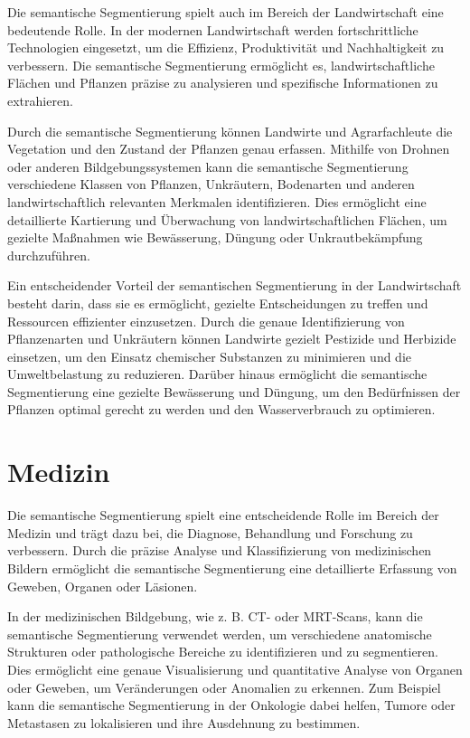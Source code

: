Die semantische Segmentierung spielt auch im Bereich der Landwirtschaft eine
bedeutende Rolle. In der modernen Landwirtschaft werden fortschrittliche
Technologien eingesetzt, um die Effizienz, Produktivität und Nachhaltigkeit zu
verbessern. Die semantische Segmentierung ermöglicht es, landwirtschaftliche
Flächen und Pflanzen präzise zu analysieren und spezifische Informationen zu
extrahieren.

Durch die semantische Segmentierung können Landwirte und Agrarfachleute die
Vegetation und den Zustand der Pflanzen genau erfassen. Mithilfe von Drohnen
oder anderen Bildgebungssystemen kann die semantische Segmentierung
verschiedene Klassen von Pflanzen, Unkräutern, Bodenarten und anderen
landwirtschaftlich relevanten Merkmalen identifizieren. Dies ermöglicht eine
detaillierte Kartierung und Überwachung von landwirtschaftlichen Flächen, um
gezielte Maßnahmen wie Bewässerung, Düngung oder Unkrautbekämpfung
durchzuführen.

Ein entscheidender Vorteil der semantischen Segmentierung in der Landwirtschaft
besteht darin, dass sie es ermöglicht, gezielte Entscheidungen zu treffen und
Ressourcen effizienter einzusetzen. Durch die genaue Identifizierung von
Pflanzenarten und Unkräutern können Landwirte gezielt Pestizide und Herbizide
einsetzen, um den Einsatz chemischer Substanzen zu minimieren und die
Umweltbelastung zu reduzieren. Darüber hinaus ermöglicht die semantische
Segmentierung eine gezielte Bewässerung und Düngung, um den Bedürfnissen der
Pflanzen optimal gerecht zu werden und den Wasserverbrauch zu optimieren.

\section{Medizin}
Die semantische Segmentierung spielt eine entscheidende Rolle im Bereich der
Medizin und trägt dazu bei, die Diagnose, Behandlung und Forschung zu
verbessern. Durch die präzise Analyse und Klassifizierung von medizinischen
Bildern ermöglicht die semantische Segmentierung eine detaillierte Erfassung
von Geweben, Organen oder Läsionen.

In der medizinischen Bildgebung, wie z. B. CT- oder MRT-Scans, kann die
semantische Segmentierung verwendet werden, um verschiedene anatomische
Strukturen oder pathologische Bereiche zu identifizieren und zu segmentieren.
Dies ermöglicht eine genaue Visualisierung und quantitative Analyse von Organen
oder Geweben, um Veränderungen oder Anomalien zu erkennen. Zum Beispiel kann
die semantische Segmentierung in der Onkologie dabei helfen, Tumore oder
Metastasen zu lokalisieren und ihre Ausdehnung zu bestimmen.

